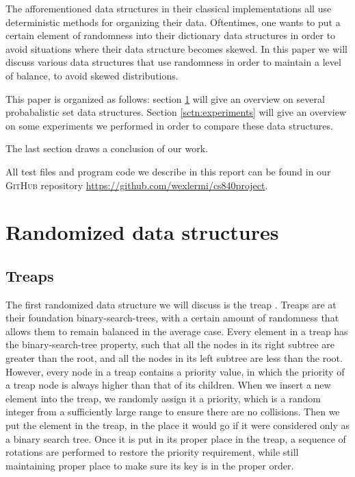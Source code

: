\documentclass[oribibl]{llncs}
\begin{document}
The afforementioned data structures in their classical implementations all use deterministic methods for organizing their data.  Oftentimes, one wants to put a certain element of randomness into their dictionary data structures in order to avoid situations where their data structure becomes skewed. In this paper we will discuss various data structures that use randomness in order to maintain a level of balance, to avoid skewed distributions.

This paper is organized as follows: section \ref{sctn:randomized_data_structures} will give an overview on several probabalistic set data structures. Section \ref{sctn:experiments} will give an overview on some experiments we performed in order to compare these data structures.

The last section draws a conclusion of our work.

All test files and program code we describe in this report can be found in our \textsc{GitHub} repository \url{https://github.com/wexlermi/cs840project}.


\section{Randomized data structures}
\label{sctn:randomized_data_structures}

\subsection{Treaps}
The first randomized data structure we will discuss is the treap \cite{Aragon1989}. Treaps are at their foundation binary-search-trees, with a certain amount of randomness that allows them to remain balanced in the average case. Every element in a treap has the binary-search-tree property, such that all the nodes in its right subtree are greater than the root, and all the nodes in its left subtree are less than the root. However, every node in a treap contains a priority value, in which the priority of a treap node is always higher than that of its children. When we insert a new element into the treap, we randomly assign it a priority, which is a random integer from a sufficiently large range to ensure there are no collisions. Then we put the element in the treap, in the place it would go if it were considered only as a binary search tree. Once it is put in its proper place in the treap, a sequence of rotations are performed to restore the priority requirement, while still maintaining proper place to make sure its key is in the proper order.
\end{document}
